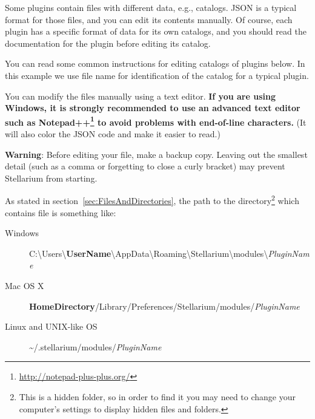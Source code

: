 Some plugins contain files with different data, e.g., catalogs. JSON is a
typical format for those files, and you can edit its contents manually. Of
course, each plugin has a specific format of data for its own catalogs, and
you should read the documentation for the plugin before editing its catalog.

You can read some common instructions for editing catalogs of plugins
below. In this example we use file name  for
identification of the catalog for a typical plugin.

You can modify the  files manually using a text
editor. \textbf{If you are using Windows, it is strongly recommended to
use an advanced text editor such as
Notepad++\footnote{\url{http://notepad-plus-plus.org/}} to avoid problems with
end-of-line characters.} (It will also color the JSON code and make it
easier to read.)

\textbf{Warning}: Before editing your  file, make a
backup copy. Leaving out the smallest detail (such as a comma or
forgetting to close a curly bracket) may prevent Stellarium from
starting.

As stated in section~\ref{sec:FilesAndDirectories}, the path to the
directory\footnote{This is a hidden folder, so in order to find it you
  may need to change your computer's settings to display hidden files
  and folders.} which contains  file is something
like:

\begin{description}
\item[Windows]
  C:\textbackslash Users\textbackslash\textbf{UserName}\textbackslash AppData\textbackslash Roaming\textbackslash Stellarium\textbackslash modules\textbackslash \textit{PluginName}
\item[Mac OS X]
  \textbf{HomeDirectory}/Library/Preferences/Stellarium/modules/\textit{PluginName}
\item[Linux and UNIX-like OS]
  \textasciitilde{}/.stellarium/modules/\textit{PluginName}
\end{description}



